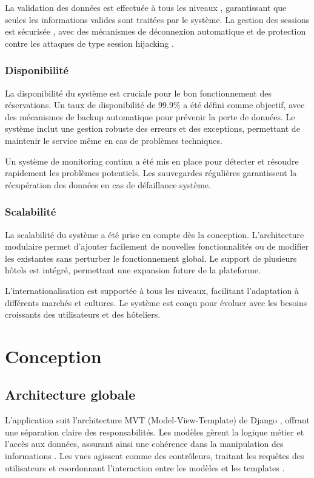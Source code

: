 \documentclass[12pt,a4paper]{report}
\begin{document}
La validation des données est effectuée à tous les niveaux \cite{web-security}, garantissant que seules les informations valides sont traitées par le système. La gestion des sessions est sécurisée \cite{security-headers}, avec des mécanismes de déconnexion automatique et de protection contre les attaques de type session hijacking \cite{security-checklist}.

\subsection{Disponibilité}
La disponibilité du système est cruciale pour le bon fonctionnement des réservations. Un taux de disponibilité de 99.9\% a été défini comme objectif, avec des mécanismes de backup automatique pour prévenir la perte de données. Le système inclut une gestion robuste des erreurs et des exceptions, permettant de maintenir le service même en cas de problèmes techniques.

Un système de monitoring continu a été mis en place pour détecter et résoudre rapidement les problèmes potentiels. Les sauvegardes régulières garantissent la récupération des données en cas de défaillance système.

\subsection{Scalabilité}
La scalabilité du système a été prise en compte dès la conception. L'architecture modulaire permet d'ajouter facilement de nouvelles fonctionnalités ou de modifier les existantes sans perturber le fonctionnement global. Le support de plusieurs hôtels est intégré, permettant une expansion future de la plateforme.

L'internationalisation est supportée à tous les niveaux, facilitant l'adaptation à différents marchés et cultures. Le système est conçu pour évoluer avec les besoins croissants des utilisateurs et des hôteliers.

\chapter{Conception}
\section{Architecture globale}
L'application suit l'architecture MVT (Model-View-Template) de Django \cite{django-docs}, offrant une séparation claire des responsabilités. Les modèles gèrent la logique métier et l'accès aux données, assurant ainsi une cohérence dans la manipulation des informations \cite{design-patterns}. Les vues agissent comme des contrôleurs, traitant les requêtes des utilisateurs et coordonnant l'interaction entre les modèles et les templates \cite{rest-docs}.
\end{document}
